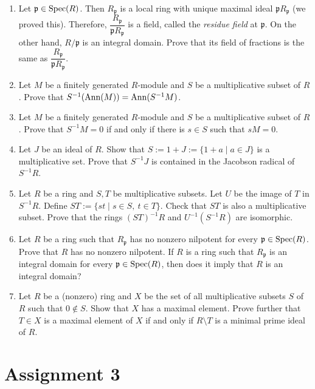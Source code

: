\begin{enumerate}[label=\arabic*.]
\item Let $\mathfrak p \in \operatorname{Spec}(R)$. Then $R_{\mathfrak p}$ is a local ring with unique maximal ideal $\mathfrak p R_{\mathfrak p}$ (we proved this). Therefore, $\dfrac{R_{\mathfrak p}}{\mathfrak p R_{\mathfrak p}}$ is a field, called the \emph{residue field} at $\mathfrak p$. On the other hand, $R/\mathfrak p$ is an integral domain. Prove that its field of fractions is the same as $\dfrac{R_{\mathfrak p}}{\mathfrak p R_{\mathfrak p}}$.

\item Let $M$ be a finitely generated $R$-module and $S$ be a multiplicative subset of $R$. Prove that $S^{-1}(\operatorname{Ann}(M)) = \operatorname{Ann}(S^{-1}M)$.

\item Let $M$ be a finitely generated $R$-module and $S$ be a multiplicative subset of $R$. Prove that $S^{-1}M = 0$ if and only if there is $s \in S$ such that $sM=0$.

\item Let $J$ be an ideal of $R$. Show that $S := 1+J := \{1+a \mid a \in J\}$ is a multiplicative set. Prove that $S^{-1}J$ is contained in the Jacobson radical of $S^{-1}R$.

\item Let $R$ be a ring and $S,T$ be multiplicative subsets. Let $U$ be the image of $T$ in $S^{-1}R$. Define $ST := \{st \mid s \in S,\ t \in T\}$. Check that $ST$ is also a multiplicative subset. Prove that the rings $(ST)^{-1}R$ and $U^{-1}(S^{-1}R)$ are isomorphic.

\item Let $R$ be a ring such that $R_{\mathfrak p}$ has no nonzero nilpotent for every $\mathfrak p \in \operatorname{Spec}(R)$. Prove that $R$ has no nonzero nilpotent. If $R$ is a ring such that $R_{\mathfrak p}$ is an integral domain for every $\mathfrak p \in \operatorname{Spec}(R)$, then does it imply that $R$ is an integral domain?

\item Let $R$ be a (nonzero) ring and $X$ be the set of all multiplicative subsets $S$ of $R$ such that $0 \notin S$. Show that $X$ has a maximal element. Prove further that $T \in X$ is a maximal element of $X$ if and only if $R \setminus T$ is a minimal prime ideal of $R$.

\end{enumerate}

\section{Assignment 3}

